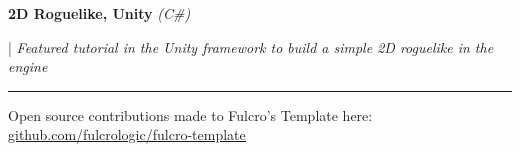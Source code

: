 \documentclass[letterpaper,11pt]{article}
\begin{document}
\begin{minipage}[t]{0.28\textwidth}
    \raggedright
    \textbf{ 2D Roguelike, Unity }\textit{(C\#)} \\
\end{minipage}
\hfill
\begin{minipage}[t]{0.70\textwidth}
    \raggedright
    |\textit{ Featured tutorial in the Unity framework to build a simple 2D roguelike in the engine} \\
\end{minipage}
\noindent\rule{19.5cm}{0.4pt}
Open source contributions made to Fulcro’s Template here: 
\href{https://github.com/fulcrologic/fulcro-template}{\underline{github.com/fulcrologic/fulcro-template}}


\end{document}

